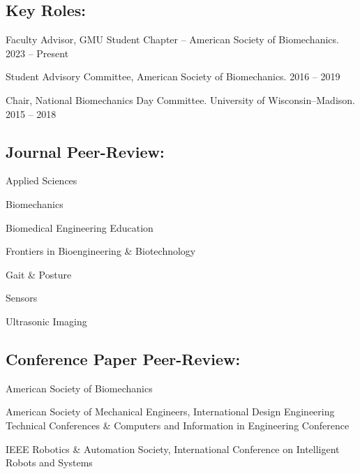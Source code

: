 \documentclass[letterpaper, 10pt]{article}
\begin{document}
\subsection{Key Roles:}
\begin{compactitem}
    \item Faculty Advisor, GMU Student Chapter -- American Society of Biomechanics. \hfill 2023 -- Present
    \item Student Advisory Committee, American Society of Biomechanics. \hfill 2016 -- 2019 %
    \item Chair, National Biomechanics Day Committee. University of Wisconsin--Madison. \hfill 2015 -- 2018
\end{compactitem}

\subsection{Journal Peer-Review:}
\begin{compactitem} %
    \item Applied Sciences    
    \item Biomechanics
    \item Biomedical Engineering Education
    \item Frontiers in Bioengineering \& Biotechnology
    \item Gait \& Posture
    \item Sensors
    \item Ultrasonic Imaging
\end{compactitem}%

\subsection{Conference Paper Peer-Review:}
\begin{compactitem} %
    \item American Society of Biomechanics
    \item American Society of Mechanical Engineers, International Design Engineering Technical Conferences \& Computers and Information in Engineering Conference
    \item IEEE Robotics \& Automation Society, International Conference on Intelligent Robots and Systems
\end{compactitem}%
\end{document}
